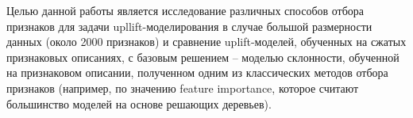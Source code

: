 \par 
Целью данной работы является исследование различных способов отбора признаков для задачи upllift-моделирования в случае большой размерности данных (около 2000 признаков) и сравнение uplift-моделей, обученных на сжатых признаковых описаниях, с базовым решением -- моделью склонности, обученной на признаковом описании, полученном одним из классических методов отбора признаков (например, по значению feature importance, которое считают большинство моделей на основе решающих деревьев).




































































































